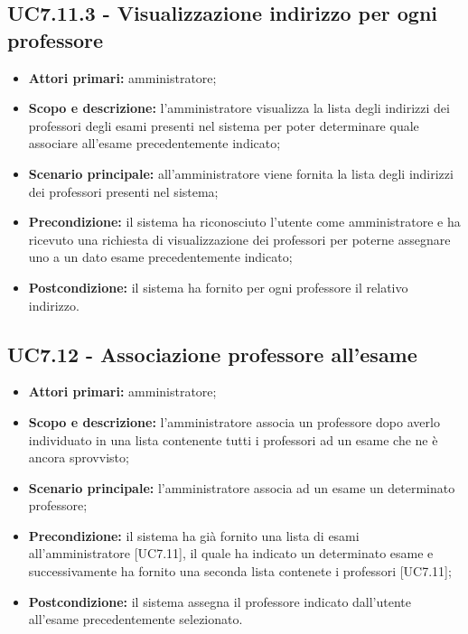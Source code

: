 \documentclass[AnalisiDeiRequisiti.tex]{subfiles}
\begin{document}
\subsection{UC7.11.3 - Visualizzazione indirizzo per ogni professore}
\begin{itemize}
	\item \textbf{Attori primari:} amministratore;
	\item \textbf{Scopo e descrizione:} l'amministratore visualizza la lista degli indirizzi dei professori degli esami presenti nel sistema per poter determinare quale associare all'esame precedentemente indicato;
	\item \textbf{Scenario principale:} all'amministratore viene fornita la lista degli indirizzi dei professori presenti nel sistema;
	\item \textbf{Precondizione:} il sistema ha riconosciuto l'utente come amministratore e ha ricevuto una richiesta di visualizzazione dei professori per poterne assegnare uno a un dato esame precedentemente indicato; 
	\item \textbf{Postcondizione:} il sistema ha fornito per ogni professore il relativo indirizzo.
\end{itemize}
\subsection{UC7.12 - Associazione professore all'esame}
\begin{itemize}
	\item \textbf{Attori primari:} amministratore;
	\item \textbf{Scopo e descrizione:} l'amministratore associa un professore dopo averlo individuato in una lista contenente tutti i professori ad un esame che ne è ancora sprovvisto;
	\item \textbf{Scenario principale:} l'amministratore associa ad un esame un determinato professore;
	\item \textbf{Precondizione:} il sistema ha già fornito una lista di esami all'amministratore [UC7.11], il quale ha indicato un determinato esame e successivamente ha fornito una seconda lista contenete i professori [UC7.11]; 
	\item \textbf{Postcondizione:} il sistema assegna il professore indicato dall'utente all'esame precedentemente selezionato.
\end{itemize}
\end{document}

